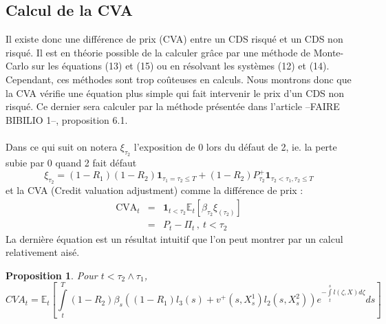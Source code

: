\documentclass[a4paper]{article}
\newtheorem{proposition}[theorem]{Proposition}
\theoremstyle{definition}
\theoremstyle{remark}
\begin{document}
\subsection{Calcul de la CVA}
Il existe donc une différence de prix (CVA) entre un CDS risqué et un CDS non risqué. Il est en théorie possible de la calculer grâce par une méthode de Monte-Carlo sur les équations (13) et (15) ou en résolvant les systèmes (12) et (14). Cependant, ces méthodes sont trop coûteuses en calculs. Nous montrons donc que la CVA vérifie une équation plus simple qui fait intervenir le prix d'un CDS non risqué. Ce dernier sera calculer par la méthode présentée dans l'article --FAIRE BIBILIO 1--, proposition 6.1. \\ \\
Dans ce qui suit on notera $\xi_{\tau_2}$ l'exposition de 0 lors du défaut de 2, ie. la perte subie par 0 quand 2 fait défaut
\begin{equation}
\xi_{\tau_2} = (1-R_1)(1-R_2) \mathbf{1}_{\tau_1 = \tau_2 \leq T} + (1 - R_2)P_{\tau_2}^+\mathbf{1}_{\tau_2 < \tau_1, \tau_2 \leq T}
\end{equation}
et la CVA (Credit valuation adjustment) comme la différence de prix :
\begin{eqnarray*}
\text{CVA}_t &=& \mathbf{1}_{t < \tau_2} \mathbb{E}_t \left[ \beta_{\tau_2}\xi_{(\tau_2)} \right] \\
&=&P_t - \Pi_t \, , \ t < \tau_2
\end{eqnarray*}
La dernière équation est un résultat intuitif que l'on peut montrer par un calcul relativement aisé. 
\begin{proposition}
Pour $t < \tau_2 \wedge \tau_1$,
\begin{equation}
CVA_t = \mathbb{E}_t \left[ \int \limits_t^T (1-R_2)\beta_s\left((1-R_1)l_3(s) + v^+(s, X^1_s)l_2(s,X^2_s)\right)e^{-\int \limits_t^sl(\zeta, X)d\zeta}ds \right]
\end{equation}
\end{proposition}
\end{document}
